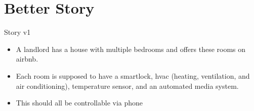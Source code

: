 ﻿\nosectionpage
\section{Better Story}
\withsectionpage

\begin{frame}{Story v1}
\begin{itemize}
\item A landlord has a house with multiple bedrooms and offers these rooms on airbnb.
\item Each room is supposed to have a smartlock, hvac (heating, ventilation, and air conditioning), temperature sensor, and an automated media system.
\item This should all be controllable via phone
\end{itemize}
\end{frame}

